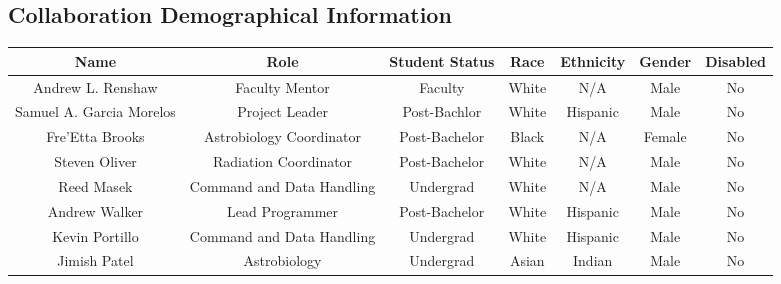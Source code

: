 \begin{appendices}
  \section{Collaboration Demographical Information}
\begin{table}[h!]
\centering  
  \begin{tabular}  {ccccccc}
      \textbf{Name} &  \textbf{Role} & \textbf{Student Status} & \textbf{Race} & \textbf{Ethnicity} & \textbf{Gender} & \textbf{Disabled}\\
 	\hline
	\hline
 	Andrew L. Renshaw & Faculty Mentor & Faculty & White & N/A & Male & No\\
 	\hline
 	Samuel A. Garcia Morelos & Project Leader & Post-Bachlor & White & Hispanic & Male & No\\
 	\hline
 	Fre'Etta Brooks & Astrobiology Coordinator & Post-Bachelor & Black & N/A & Female & No\\\hline
 	Steven Oliver & Radiation Coordinator & Post-Bachelor & White & N/A & Male & No\\\hline
 	Reed Masek & Command and Data Handling & Undergrad & White & N/A & Male & No\\\hline
 	Andrew Walker & Lead Programmer & Post-Bachelor & White & Hispanic & Male & No\\\hline
 	Kevin Portillo & Command and Data Handling & Undergrad & White & Hispanic & Male & No \\\hline
	Jimish Patel & Astrobiology & Undergrad & Asian & Indian & Male & No \\
	\end{tabular}	
	\end{table}  

\end{appendices}
